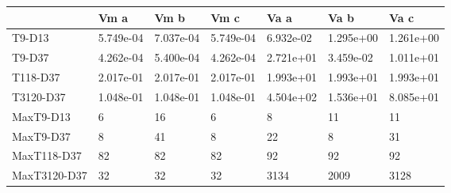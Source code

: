 \begin{tabular}{lllllll}
\toprule
{} &       Vm a &       Vm b &       Vm c &       Va a &       Va b &       Va c \\
\midrule
T9-D13       &  5.749e-04 &  7.037e-04 &  5.749e-04 &  6.932e-02 &  1.295e+00 &  1.261e+00 \\
T9-D37       &  4.262e-04 &  5.400e-04 &  4.262e-04 &  2.721e+01 &  3.459e-02 &  1.011e+01 \\
T118-D37     &  2.017e-01 &  2.017e-01 &  2.017e-01 &  1.993e+01 &  1.993e+01 &  1.993e+01 \\
T3120-D37    &  1.048e-01 &  1.048e-01 &  1.048e-01 &  4.504e+02 &  1.536e+01 &  8.085e+01 \\
MaxT9-D13    &          6 &         16 &          6 &          8 &         11 &         11 \\
MaxT9-D37    &          8 &         41 &          8 &         22 &          8 &         31 \\
MaxT118-D37  &         82 &         82 &         82 &         92 &         92 &         92 \\
MaxT3120-D37 &         32 &         32 &         32 &       3134 &       2009 &       3128 \\
\bottomrule
\end{tabular}
